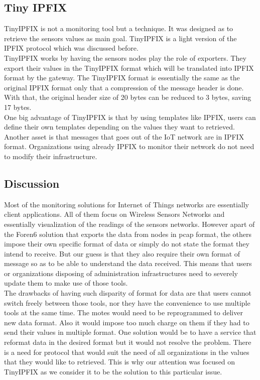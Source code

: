 \subsection{Tiny IPFIX}

TinyIPFIX \cite{schmitt2016tinyipfix} is not a monitoring tool but a technique. It was designed as to retrieve the sensors values as main goal. TinyIPFIX is a light version of the IPFIX protocol which was discussed before.\\

TinyIPFIX works by having the sensors nodes play the role of exporters. They export their values in the TinyIPFIX format which will be translated into IPFIX format by the gateway. The TinyIPFIX format is essentially the same as the original IPFIX format only that a compression of the message header is done. With that, the original header size of 20 bytes can be reduced to 3 bytes, saving 17 bytes.\\

One big advantage of TinyIPFIX is that by using templates like IPFIX, users can define their own templates depending on the values they want to retrieved. Another asset is that messages that goes out of the IoT network are in IPFIX format. Organizations using already IPFIX to monitor their network do not need to modify their infrastructure.

\subsection{Discussion}

Most of the monitoring solutions for Internet of Things networks are essentially client applications. All of them focus on Wireless Sensors Networks and essentially visualization of the readings of the sensors networks. However apart of the Foren6 solution that exports the data from nodes in pcap format, the others impose their own specific format of data or simply do not state the format they intend to receive. But our guess is that they also require their own format of message so as to be able to understand the data received. This means that users or organizations disposing of administration infrastructures need to severely update them to make use of those tools. \\

The drawbacks of having such disparity of format for data are that users cannot switch freely between those tools, nor they have the convenience to use multiple tools at the same time. The motes would need to be reprogrammed to deliver new data format. Also it would impose too much charge on them if they had to send their values in multiple format. One solution would be to have a service that reformat data in the desired format but it would not resolve the problem. There is a need for protocol that would suit the need of all organizations in the values that they would like to retrieved. This is why our attention was focused on TinyIPFIX as we consider it to be the solution to this particular issue. \\

